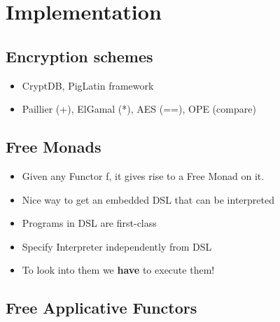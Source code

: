 \chapter{Implementation}
\label{cha:implementation}

\section{Encryption schemes}
\label{sec:encryption-schemes}

\begin{itemize}
\item CryptDB, PigLatin framework
\item Paillier (+), ElGamal (*), AES (==), OPE (compare)
\end{itemize}

\section{Free Monads}
\label{sec:free-monads}

\begin{itemize}
\item Given any Functor f, it gives rise to a Free Monad on it.
\item Nice way to get an embedded DSL that can be interpreted
\item Programs in DSL are first-class
\item Specify Interpreter independently from DSL
\item To look into them we \textbf{have} to execute them!
\end{itemize}

\section{Free Applicative Functors}
\label{sec:free-appl-funct}

